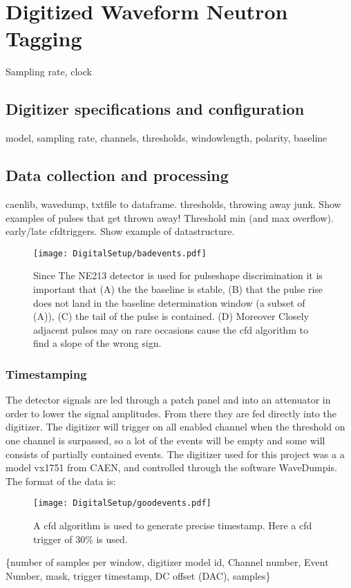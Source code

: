 \documentclass[main.tex]{subfiles}
\begin{document}
\section{Digitized Waveform Neutron Tagging}
Sampling rate, clock
\subsection{Digitizer specifications and configuration}
model, sampling rate, channels, thresholds, windowlength, polarity, baseline
\subsection{Data collection and processing}
caenlib, wavedump, txtfile to dataframe. thresholds, throwing away junk.
Show examples of pulses that get thrown away! Threshold min (and max overflow). early/late cfdtriggers.
Show example of datastructure.

\begin{figure}[ht!]
    \centering
        \texttt{[image: DigitalSetup/badevents.pdf]}
        \caption{Since The NE213 detector is used for pulseshape discrimination it is important that (A) the the baseline is stable, (B) that the pulse rise does not land in the baseline determination window (a subset of (A)), (C) the tail of the pulse is contained. (D) Moreover Closely adjacent pulses may on rare occasions cause the cfd algorithm to find a slope of the wrong sign.}
    \label{fig:badevents} 
\end{figure}

\subsubsection{Timestamping}
The detector signals are led through a patch panel and into an attenuator in order to lower the signal amplitudes. From there they are fed directly into the digitizer. The digitizer will trigger on all enabled channel when the threshold on one channel is surpassed, so a lot of the events will be empty and some will consists of partially contained events. The digitizer used for this project was a a model vx1751 from CAEN, and controlled through the software WaveDumpis. The format of the data is:
\begin{figure}[ht!]
    \centering
        \texttt{[image: DigitalSetup/goodevents.pdf]}
        \caption{A cfd algorithm is used to generate precise timestamp. Here a cfd trigger of 30\% is used.}
    \label{fig:badevents} 
\end{figure}
\{number of samples per window, digitizer model id, Channel number, Event Number, mask, trigger timestamp, DC offset (DAC), samples\}
\end{document}
